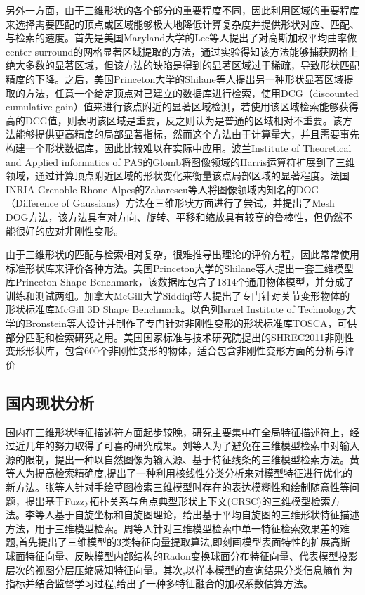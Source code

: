 另外一方面，由于三维形状的各个部分的重要程度不同，因此利用区域的重要程度来选择需要匹配的顶点或区域能够极大地降低计算复杂度并提供形状对应、匹配、与检索的速度。首先是美国Maryland大学的Lee等人\cite{Lee2005Mesh}提出了对高斯加权平均曲率做center-surround的网格显著区域提取的方法，通过实验得知该方法能够捕获网格上绝大多数的显著区域，但该方法的缺陷是得到的显著区域过于稀疏，导致形状匹配精度的下降。之后，美国Princeton大学的Shilane等人\cite{Shilane2007Distinctive}提出另一种形状显著区域提取的方法，任意一个给定顶点对已建立的数据库进行检索，使用DCG（discounted cumulative gain）值来进行该点附近的显著区域检测，若使用该区域检索能够获得高的DCG值，则表明该区域是重要，反之则认为是普通的区域相对不重要。该方法能够提供更高精度的局部显著指标，然而这个方法由于计算量大，并且需要事先构建一个形状数据库，因此比较难以在实际中应用。波兰Institute of Theoretical and Applied informatics of PAS的Glomb\cite{G2009Detection}将图像领域的Harris运算符扩展到了三维领域，通过计算顶点附近区域的形状变化来衡量该点局部区域的显著程度。法国INRIA Grenoble Rhone-Alpes的Zaharescu等人\cite{Zaharescu2009Surface}将图像领域内知名的DOG（Difference of Gaussians）方法在三维形状方面进行了尝试，并提出了Mesh DOG方法，该方法具有对方向、旋转、平移和缩放具有较高的鲁棒性，但仍然不能很好的应对非刚性变形。

由于三维形状的匹配与检索相对复杂，很难推导出理论的评价方程，因此常常使用标准形状库来评价各种方法。美国Princeton大学的Shilane等人\cite{Shilane2004The}提出一套三维模型库Princeton Shape Benchmark，该数据库包含了1814个通用物体模型，并分成了训练和测试两组。加拿大McGill大学Siddiqi等人\cite{Siddiqi2008Retrieving}提出了专门针对关节变形物体的形状标准库McGill 3D Shape Benchmark。以色列Israel Institute of Technology大学的Bronstein等人\cite{Bronstein2009Numerical}设计并制作了专门针对非刚性变形的形状标准库TOSCA，可供部分匹配和检索研究之用。美国国家标准与技术研究院提出的SHREC2011非刚性变形形状库\cite{Lian2011SHREC}，包含600个非刚性变形的物体，适合包含非刚性变形方面的分析与评价

\subsection{国内现状分析}

国内在三维形状特征描述符方面起步较晚，研究主要集中在全局特征描述符上，经过近几年的努力取得了可喜的研究成果。刘等人\cite{刘志2016基于特征线条的三维模型检索方法}为了避免在三维模型检索中对输入源的限制，提出一种以自然图像为输入源、基于特征线条的三维模型检索方法。黄等人\cite{黄骥2016基于核线性分类分析的三维模型检索算法}为提高检索精确度,提出了一种利用核线性分类分析来对模型特征进行优化的新方法。张等人\cite{张全贵2017融合}针对手绘草图检索三维模型时存在的表达模糊性和绘制随意性等问题，提出基于Fuzzy拓扑关系与角点典型形状上下文(CRSC)的三维模型检索方法。李等人\cite{李闯2016基于平均自旋图的三维形状特征描述}基于自旋坐标和自旋图理论，给出基于平均自旋图的三维形状特征描述方法，用于三维模型检索。周等人\cite{周燕2016基于多特征融合的三维模型检索算法}针对三维模型检索中单一特征检索效果差的难题,首先提出了三维模型的3类特征向量提取算法,即刻画模型表面特性的扩展高斯球面特征向量、反映模型内部结构的Radon变换球面分布特征向量、代表模型投影层次的视图分层压缩感知特征向量。其次,以样本模型的查询结果分类信息熵作为指标并结合监督学习过程,给出了一种多特征融合的加权系数估算方法。

